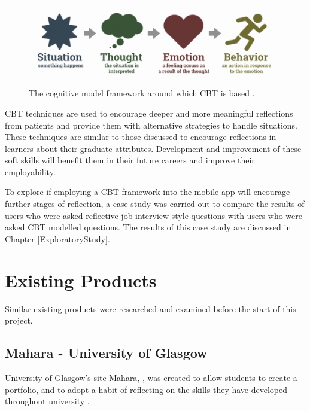 \documentclass{l4proj}
\begin{document}
\begin{figure}[h!]
    \begin{centering}
    \includegraphics[scale=0.5]{images/cognitive-model.png}
    \caption{The cognitive model framework around which CBT is based \citep{therapist_aid_psychoeducation}.}
    \label{fig: CognitiveModel}
    \end{centering}
\end{figure}

CBT techniques are used to encourage deeper and more meaningful reflections from patients and provide them with alternative strategies to handle situations. These techniques are similar to those discussed to encourage reflections in learners about their graduate attributes. Development and improvement of these soft skills will benefit them in their future careers and improve their employability.

To explore if employing a CBT framework into the mobile app will encourage further stages of reflection, a case study was carried out to compare the results of users who were asked reflective job interview style questions with users who were asked CBT modelled questions. The results of this case study are discussed in Chapter \ref{ExploratoryStudy}.

\section{Existing Products}

Similar existing products were researched and examined before the start of this project.

\subsection{Mahara - University of Glasgow}

University of Glasgow's site Mahara, \citep{mahara_dashboard}, was created to allow students to create a portfolio, and to adopt a habit of reflecting on the skills they have developed throughout university \citep{glasgow_university_attributes}.
\end{document}

